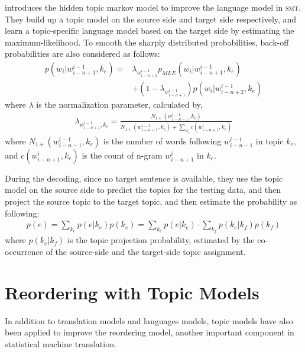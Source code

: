 \citet{Yu-2013} introduces the hidden topic markov model to improve the language model in \textsc{smt}. They build up a topic model on the source side and target side respectively, and learn a topic-specific language model based on the target side by estimating the maximum-likelihood. To smooth the sharply distributed probabilities, back-off probabilities are also considered as follows:
\begin{align}
p(w_i | w^{i-1}_{i-n+1}, k_e) = &\lambda_{w^{i-1}_{i-n+1}} p_{MLE}(w_i|w^{i-1}_{i-n+1}, k_e) \\
&+ (1- \lambda_{w^{i-1}_{i-n+1}})p(w_i|w^{i-1}_{i-n+2}, k_e)
\end{align}
where $\lambda$ is the normalization parameter, calculated by,
\begin{align}
\lambda_{w^{i-1}_{i-n+1}, k_e} = \frac{N_{1+}(w^{i-1}_{i-n-1}, k_e)}{N_{1+}(w^{i-1}_{i-n-1}, k_e) + \sum_{w_i}c(w^i_{i-n+1}, k_e)}
\end{align}
where $N_{1+}(w^{i-1}_{i-n-1}, k_e)$ is the number of words following $w^{i-1}_{i-n-1}$ in topic $k_e$, and $c(w^i_{i-n+1}, k_e)$ is the count of n-gram $w^i_{i-n+1}$ in $k_e$.

During the decoding, since no target sentence is available, they use the topic model on the source side to predict the topics for the testing data, and then project the source topic to the target topic, and then estimate the probability as following:
\begin{align}
p(e) = \sum_{k_e} p(e|k_e) p(k_e) = \sum_{k_e} p(e|k_e) \cdot \sum_{k_f} p(k_e|k_f) p (k_f)
\end{align}
where $p(k_e|k_f)$ is the topic projection probability, estimated by the co-occurrence of the source-side and the target-side topic assignment.

\section{Reordering with Topic Models}

In addition to translation models and languages models, topic models have also been applied to improve the reordering model, another important component in statistical machine translation.

